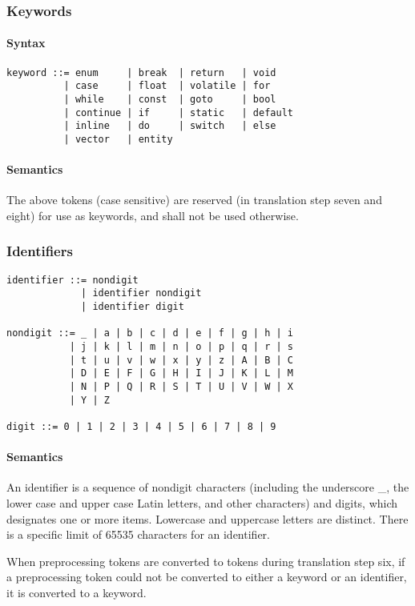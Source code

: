 \documentclass{article}
\begin{document}
\subsubsection{Keywords}
\paragraph*{Syntax}
\begin{lstlisting}[language=bnf]
keyword ::= enum     | break  | return   | void
          | case     | float  | volatile | for
          | while    | const  | goto     | bool
          | continue | if     | static   | default
          | inline   | do     | switch   | else
          | vector   | entity
\end{lstlisting}
\paragraph*{Semantics}
The above tokens (case sensitive) are reserved (in translation step seven and eight) for 
use as keywords, and shall not be used otherwise.

\subsubsection{Identifiers}
\begin{lstlisting}[language=bnf]
identifier ::= nondigit
             | identifier nondigit
             | identifier digit
             
nondigit ::= _ | a | b | c | d | e | f | g | h | i 
           | j | k | l | m | n | o | p | q | r | s
           | t | u | v | w | x | y | z | A | B | C
           | D | E | F | G | H | I | J | K | L | M
           | N | P | Q | R | S | T | U | V | W | X
           | Y | Z

digit ::= 0 | 1 | 2 | 3 | 4 | 5 | 6 | 7 | 8 | 9
\end{lstlisting}
\paragraph*{Semantics}
An identifier is a sequence of nondigit characters (including the underscore \_, the lower
case and upper case Latin letters, and other characters) and digits, which designates one
or more items. Lowercase and uppercase letters are distinct. There is a specific limit of
65535 characters for an identifier.
\linebreak

When preprocessing tokens are converted to tokens during translation step six, if a 
preprocessing token could not be converted to either a keyword or an identifier, it is
converted to a keyword.
\end{document}
